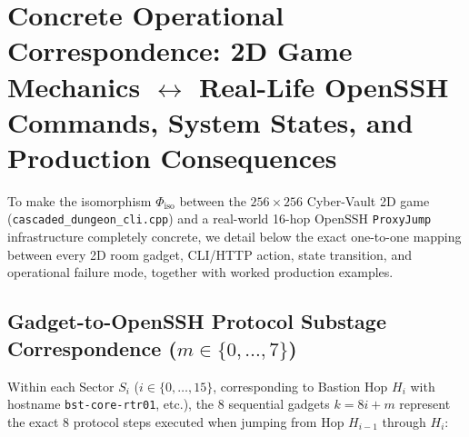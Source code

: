 \documentclass[11pt,a4paper]{article}
\theoremstyle{definition}
\theoremstyle{remark}
\begin{document}
\section{Concrete Operational Correspondence: 2D Game Mechanics $\leftrightarrow$ Real-Life OpenSSH Commands, System States, and Production Consequences}

To make the isomorphism $\Phi_{\text{iso}}$ between the $256 \times 256$ Cyber-Vault 2D game (\texttt{cascaded\_dungeon\_cli.cpp}) and a real-world 16-hop OpenSSH \texttt{ProxyJump} infrastructure completely concrete, we detail below the exact one-to-one mapping between every 2D room gadget, CLI/HTTP action, state transition, and operational failure mode, together with worked production examples.

\subsection{Gadget-to-OpenSSH Protocol Substage Correspondence ($m \in \{0, \dots, 7\}$)}

Within each Sector $S_i$ ($i \in \{0, \dots, 15\}$, corresponding to Bastion Hop $H_i$ with hostname \texttt{bst-core-rtr01}, etc.), the 8 sequential gadgets $k = 8i + m$ represent the exact 8 protocol steps executed when jumping from Hop $H_{i-1}$ through $H_i$:
\end{document}

